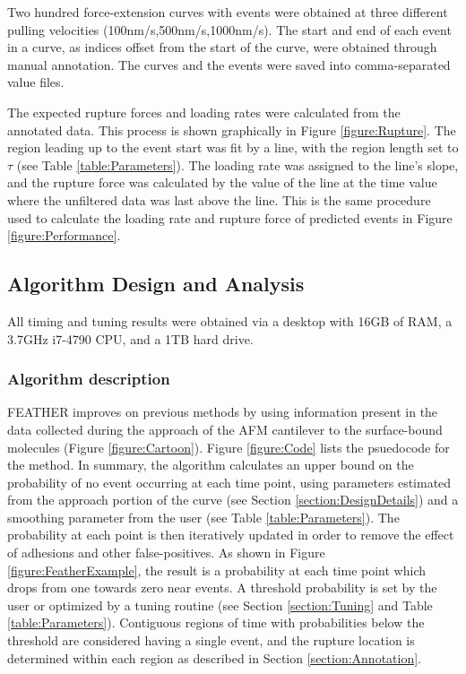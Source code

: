 \documentclass[%
  aip,12pt,tightenlines,
  amsthm,
 amsmath,amssymb
]{article}
\newcommand{\tRef}[1]{Table \ref{table:#1}}
\newcommand{\fRef}[1]{Figure \ref{figure:#1}}
\newcommand{\sRef}[1]{Section \ref{section:#1}}
\newcommand{\sLabel}[1]{\label{section:#1}}
\newcommand{\firstp}[0]{}
\newcommand{\pl}[0]{\vspace{6pt}}
\newcommand{\name}[0]{FEATHER}
\begin{document}
\firstp Two hundred force-extension curves with events were obtained at three different pulling velocities (100nm/s,500nm/s,1000nm/s). The start and end of each event in a curve, as indices offset from the start of the curve, were obtained through manual annotation. The curves and the events were saved into comma-separated value files. \pl

The expected rupture forces and loading rates were calculated from the annotated data. This process is shown graphically in \fRef{Rupture}. The region leading up to the event start was fit by a line, with the region length set to $\tau$ (see \tRef{Parameters}). The loading rate was assigned to the line's slope, and the rupture force was calculated by the value of the line at the time value where the unfiltered data was last above the line. This is the same procedure used to calculate the loading rate and rupture force of predicted events in \fRef{Performance}. \pl



\subsection{\sLabel{Algorithm}Algorithm Design and Analysis}

All timing and tuning results were obtained via a desktop with 16GB of RAM, a 3.7GHz i7-4790 CPU, and a 1TB hard drive. \pl

\subsubsection{\sLabel{Metrics}Algorithm description}

\name{} improves on previous methods by using information present in the data collected during the approach of the AFM cantilever to the surface-bound molecules (\fRef{Cartoon}).  \fRef{Code} lists the psuedocode for the method. In summary, the algorithm calculates an upper bound on the probability of no event occurring at each time point, using parameters estimated from the approach portion of the curve (see \sRef{DesignDetails}) and a smoothing parameter from the user (see \tRef{Parameters}). The probability at each point is then iteratively updated in order to remove the effect of adhesions and other false-positives. As shown in \fRef{FeatherExample}, the result is a probability at each time point which drops from one towards zero near events. A threshold probability is set by the user or optimized by a tuning routine (see \sRef{Tuning} and \tRef{Parameters}). Contiguous regions of time with probabilities below the threshold are considered having a single event, and the rupture location is determined within each region as described in \sRef{Annotation}.
\end{document}
